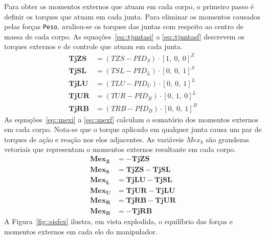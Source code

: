 Para obter os momentos externos que atuam em cada corpo, o primeiro passo é
definir os torques que atuam em cada junta. Para eliminar os momentos causados
pelas forças \texttt{Peso}, avaliou-se os torques das juntas com respeito ao
centro de massa de cada corpo. As equações~\ref{eq::tjuntasi} a
\ref{eq::tjuntasf} descrevem os torques externos e de controle que atuam em cada
junta.
\begin{align}
	\mathbf{TjZS} &= (TZS - PID_{S})\cdot[1,~0,~0]^Z \label{eq::tjuntasi} \\
	\mathbf{TjSL} &= (TSL - PID_{L})\cdot[0,~0,~1]^S \\
	\mathbf{TjLU} &= (TLU - PID_{U})\cdot[0,~0,~1]^L \\
	\mathbf{TjUR} &= (TUR - PID_{R})\cdot[0,~1,~0]^L \\
	\mathbf{TjRB} &= (TRB - PID_{B})\cdot[0,~0,~1]^B \label{eq::tjuntasf}
\end{align}
%
As equações~\ref{eq::mexi} a \ref{eq::mexf} calculam o somatório dos momentos
externos em cada corpo. Nota-se que o torque aplicado em qualquer junta causa
um par de torques de ação e reação nos elos adjacentes. As variáveis $Mex_k$ são
grandezas vetoriais que representam o momentos externos resultante em cada
corpo.
%
\begin{align}
	\mathbf{Mex_{Z}} &= - \mathbf{TjZS } \label{eq::mexi}\\
	\mathbf{Mex_{S}} &= \mathbf{TjZS} - \mathbf{TjSL }\\
	\mathbf{Mex_{L}} &= \mathbf{TjLU }- \mathbf{TjSL }\\
	\mathbf{Mex_{U}} &= \mathbf{TjUR }- \mathbf{TjLU }\\
	\mathbf{Mex_{R}} &= \mathbf{TjRB }- \mathbf{TjUR }\\
	\mathbf{Mex_{B}} &= - \mathbf{TjRB} \label{eq::mexf}
	\end{align}
%
A Figura~\ref{fig::sisfex} ilustra, em vista explodida, o equilíbrio das forças e
momentos externos em cada elo do manipulador.
%
